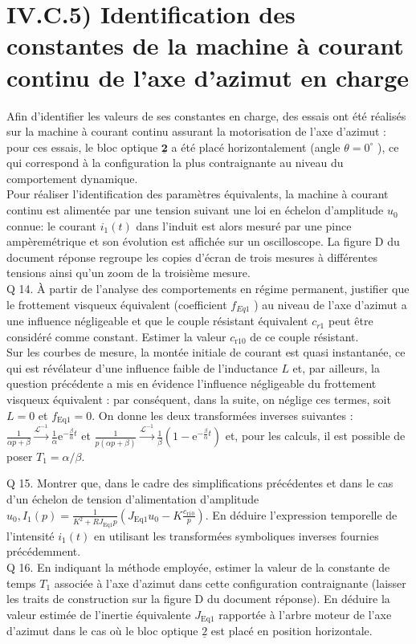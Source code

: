 \documentclass[10pt]{article}
\begin{document}
\section*{IV.C.5) Identification des constantes de la machine à courant continu de l'axe d'azimut en charge}
Afin d'identifier les valeurs de ses constantes en charge, des essais ont été réalisés sur la machine à courant continu assurant la motorisation de l'axe d'azimut : pour ces essais, le bloc optique $\underline{\mathbf{2}}$ a été placé horizontalement (angle $\theta=0^{\circ}$ ), ce qui correspond à la configuration la plus contraignante au niveau du comportement dynamique.\\
Pour réaliser l'identification des paramètres équivalents, la machine à courant continu est alimentée par une tension suivant une loi en échelon d'amplitude $u_{0}$ connue: le courant $i_{1}(t)$ dans l'induit est alors mesuré par une pince ampèremétrique et son évolution est affichée sur un oscilloscope. La figure D du document réponse regroupe les copies d'écran de trois mesures à différentes tensions ainsi qu'un zoom de la troisième mesure.\\
Q 14. À partir de l'analyse des comportements en régime permanent, justifier que le frottement visqueux équivalent (coefficient $f_{E q 1}$ ) au niveau de l'axe d'azimut a une influence négligeable et que le couple résistant équivalent $c_{r 1}$ peut être considéré comme constant. Estimer la valeur $c_{\mathrm{r} 10}$ de ce couple résistant.\\
Sur les courbes de mesure, la montée initiale de courant est quasi instantanée, ce qui est révélateur d'une influence faible de l'inductance $L$ et, par ailleurs, la question précédente a mis en évidence l'influence négligeable du frottement visqueux équivalent : par conséquent, dans la suite, on néglige ces termes, soit $L=0$ et $f_{\mathrm{Eq} 1}=0$. On donne les deux transformées inverses suivantes : $\frac{1}{\alpha p+\beta} \xrightarrow{\mathcal{L}^{-1}} \frac{1}{\alpha} \mathrm{e}^{-\frac{\beta}{\alpha} t}$ et $\frac{1}{p(\alpha p+\beta)} \xrightarrow{\mathcal{L}^{-1}} \frac{1}{\beta}\left(1-\mathrm{e}^{-\frac{\beta}{\alpha} t}\right)$ et, pour les calculs, il est possible de poser $T_{1}=\alpha / \beta$.

Q 15. Montrer que, dans le cadre des simplifications précédentes et dans le cas d'un échelon de tension d'alimentation d'amplitude $u_{0}, I_{1}(p)=\frac{1}{K^{2}+R J_{\mathrm{Eq} 1} p}\left(J_{\mathrm{Eq} 1} u_{0}-K \frac{c_{\mathrm{r} 10}}{p}\right)$. En déduire l'expression temporelle de l'intensité $i_{1}(t)$ en utilisant les transformées symboliques inverses fournies précédemment.\\
Q 16. En indiquant la méthode employée, estimer la valeur de la constante de temps $T_{1}$ associée à l'axe d'azimut dans cette configuration contraignante (laisser les traits de construction sur la figure D du document réponse). En déduire la valeur estimée de l'inertie équivalente $J_{\mathrm{Eq1}}$ rapportée à l'arbre moteur de l'axe d'azimut dans le cas où le bloc optique $\underline{2}$ est placé en position horizontale.
\end{document}
